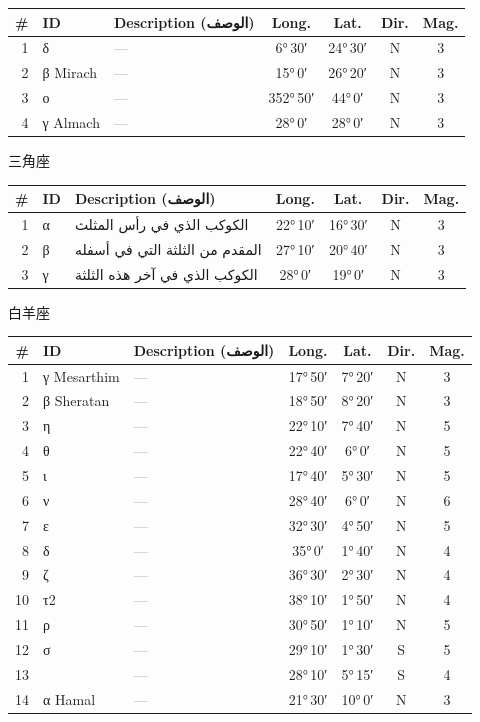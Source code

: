 \documentclass[9pt,a4paper]{extarticle}
\newcommand{\ar}[1]{{\arabicfont\textarabic{#1}}}
\begin{document}
\begin{longtable}{r l >{\raggedright\arraybackslash}p{6.7cm} c c c c}
\toprule \# & ID & Description (\ar{الوصف}) & Long. & Lat. & Dir. & Mag.\\ \midrule\endhead
1 & δ & \textcolor{gray}{—} & 6°\,30′ & 24°\,30′ & N & 3\\
2 & β Mirach & \textcolor{gray}{—} & 15°\,0′ & 26°\,20′ & N & 3\\
3 & ο & \textcolor{gray}{—} & 352°\,50′ & 44°\,0′ & N & 3\\
4 & γ Almach & \textcolor{gray}{—} & 28°\,0′ & 28°\,0′ & N & 3\\
\bottomrule\end{longtable}
\vspace{4pt}\quad\ar{المثلث}\quad 三角座
\begin{longtable}{r l >{\raggedright\arraybackslash}p{6.7cm} c c c c}
\toprule \# & ID & Description (\ar{الوصف}) & Long. & Lat. & Dir. & Mag.\\ \midrule\endhead
1 & α & \ar{الكوكب الذي في رأس المثلث} & 22°\,10′ & 16°\,30′ & N & 3\\
2 & β & \ar{المقدم من الثلثة التي في أسفله} & 27°\,10′ & 20°\,40′ & N & 3\\
3 & γ & \ar{الكوكب الذي في آخر هذه الثلثة} & 28°\,0′ & 19°\,0′ & N & 3\\
\bottomrule\end{longtable}
\vspace{4pt}\quad\ar{الحمل}\quad 白羊座
\begin{longtable}{r l >{\raggedright\arraybackslash}p{6.7cm} c c c c}
\toprule \# & ID & Description (\ar{الوصف}) & Long. & Lat. & Dir. & Mag.\\ \midrule\endhead
1 & γ Mesarthim & \textcolor{gray}{—} & 17°\,50′ & 7°\,20′ & N & 3\\
2 & β Sheratan & \textcolor{gray}{—} & 18°\,50′ & 8°\,20′ & N & 3\\
3 & η & \textcolor{gray}{—} & 22°\,10′ & 7°\,40′ & N & 5\\
4 & θ & \textcolor{gray}{—} & 22°\,40′ & 6°\,0′ & N & 5\\
5 & ι & \textcolor{gray}{—} & 17°\,40′ & 5°\,30′ & N & 5\\
6 & ν & \textcolor{gray}{—} & 28°\,40′ & 6°\,0′ & N & 6\\
7 & ε & \textcolor{gray}{—} & 32°\,30′ & 4°\,50′ & N & 5\\
8 & δ & \textcolor{gray}{—} & 35°\,0′ & 1°\,40′ & N & 4\\
9 & ζ & \textcolor{gray}{—} & 36°\,30′ & 2°\,30′ & N & 4\\
10 & τ2 & \textcolor{gray}{—} & 38°\,10′ & 1°\,50′ & N & 4\\
11 & ρ & \textcolor{gray}{—} & 30°\,50′ & 1°\,10′ & N & 5\\
12 & σ & \textcolor{gray}{—} & 29°\,10′ & 1°\,30′ & S & 5\\
13 &  & \textcolor{gray}{—} & 28°\,10′ & 5°\,15′ & S & 4\\
14 & α Hamal & \textcolor{gray}{—} & 21°\,30′ & 10°\,0′ & N & 3\\
\bottomrule\end{longtable}
\end{document}
